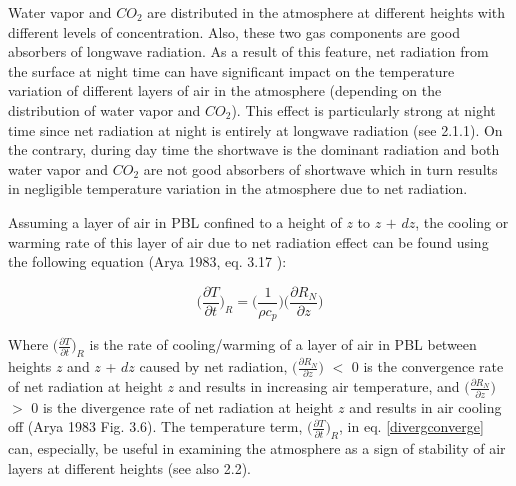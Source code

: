 \documentclass[a4paper,12pt]{article}
\numberwithin{equation}{section} %
\begin{document}
Water vapor and $CO_2$ are distributed in the atmosphere at different heights with different levels of concentration. Also, these two gas components are good absorbers of longwave radiation. As a result of this feature, net radiation from the surface at night time can have significant impact on the temperature variation of different layers of air in the atmosphere (depending on the distribution of water vapor and $CO_2$). This effect is particularly strong at night time since net radiation at night is entirely at longwave radiation (see 2.1.1). On the contrary, during day time the shortwave is the dominant radiation and both water vapor and $CO_2$ are not good absorbers of shortwave which in turn results in negligible temperature variation in the atmosphere due to net radiation. 

Assuming a layer of air in PBL confined to a height of $z$ to $z$ $+$ $dz$, the cooling or warming rate of this layer of air due to net radiation effect can be found using the following equation (Arya 1983, eq. 3.17 ): 

\vspace{0.25cm}
\begin{equation}\label{divergconverge}
\Big(\frac{\partial T}{\partial t}\Big)_R = \Big(\frac{1}{\rho c_p}\Big)\Big(\frac{\partial R_N}{\partial z}\Big)
\end{equation}
\vspace{0.25cm}

Where $\Big(\frac{\partial T}{\partial t}\Big)_R$ is the rate of cooling/warming of a layer of air in PBL between heights $z$ and $z$ + $dz$ caused by net radiation, $\Big(\frac{\partial R_N}{\partial z}\Big)$ $<$ 0 is the convergence rate of net radiation at height $z$ and results in increasing air temperature, and $\Big(\frac{\partial R_N}{\partial z}\Big)$ $>$ 0 is the divergence rate of net radiation at height $z$ and results in air cooling off (Arya 1983 Fig. 3.6). The temperature term, $\Big(\frac{\partial T}{\partial t}\Big)_R$, in eq. \ref{divergconverge} can, especially, be useful in examining the atmosphere as a sign of stability of air layers at different heights (see also 2.2).


\end{document}
